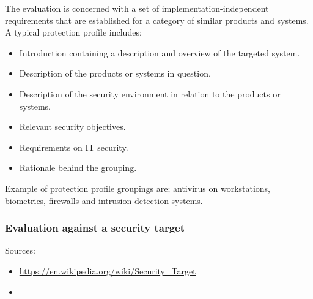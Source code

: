 \documentclass[10pt]{article}
\begin{document}
        The evaluation is concerned with a set of implementation-independent
        requirements that are established for a category of similar products
        and systems. A typical protection profile includes:
        \begin{itemize}
          \item{Introduction containing a description and overview of the
            targeted system.}
          \item{Description of the products or systems in question.}
          \item{Description of the security environment in relation to the
            products or systems.}
          \item{Relevant security objectives.}
          \item{Requirements on IT security.}
          \item{Rationale behind the grouping.}
        \end{itemize}
        Example of protection profile groupings are; antivirus on workstations,
        biometrics, firewalls and intrusion detection systems.

      \subsubsection{Evaluation against a security target}
      Sources:
      \begin{itemize}
        \item{\url{https://en.wikipedia.org/wiki/Security_Target}}
        \item{}
      \end{itemize}
\end{document}
